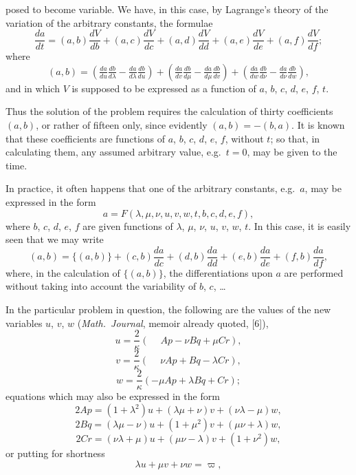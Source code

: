 \documentclass[11pt]{article}
\begin{document}
posed to become variable. We have, in this case, by Lagrange's theory of the variation of the arbitrary constants, the formulae
\[
\frac{da}{dt} = (a, b)\frac{dV}{db} + (a, c)\frac{dV}{dc} + (a, d)\frac{dV}{dd} + (a, e)\frac{dV}{de} + (a, f)\frac{dV}{df};
\]
where
\[
(a, b) = \left(\tfrac{da}{du}\tfrac{db}{d\lambda} - \tfrac{da}{d\lambda}\tfrac{db}{du}\right) + \left(\tfrac{da}{dv}\tfrac{db}{d\mu} - \tfrac{da}{d\mu}\tfrac{db}{dv}\right) + \left(\tfrac{da}{dw}\tfrac{db}{d\nu} - \tfrac{da}{d\nu}\tfrac{db}{dw}\right),
\]
and in which $V$ is supposed to be expressed as a function of $a$, $b$, $c$, $d$, $e$, $f$, $t$.

Thus the solution of the problem requires the calculation of thirty coefficients $(a, b)$, or rather of fifteen only, since evidently $(a, b) = -(b, a)$. It is known that these coefficients are functions of $a$, $b$, $c$, $d$, $e$, $f$, without $t$; so that, in calculating them, any assumed arbitrary value, e.g.\ $t = 0$, may be given to the time.

In practice, it often happens that one of the arbitrary constants, e.g.\ $a$, may be expressed in the form
\[
a = F(\lambda, \mu, \nu, u, v, w, t, b, c, d, e, f),
\]
where $b$, $c$, $d$, $e$, $f$ are given functions of $\lambda$, $\mu$, $\nu$, $u$, $v$, $w$, $t$. In this case, it is easily seen that we may write
\[
(a, b) = \{(a, b)\} + (c, b)\frac{da}{dc} + (d, b)\frac{da}{dd} + (e, b)\frac{da}{de} + (f, b)\frac{da}{df},
\]
where, in the calculation of $\{(a, b)\}$, the differentiations upon $a$ are performed without taking into account the variability of $b$, $c$, \ldots

In the particular problem in question, the following are the values of the new variables $u$, $v$, $w$ (\textit{Math.\ Journal}, memoir already quoted, [6]),
\[
u = \frac{2}{\kappa}(\phantom{-}Ap - \nu Bq + \mu Cr) \tag{29},
\]
\[
v = \frac{2}{\kappa}(\phantom{-}\nu Ap + Bq - \lambda Cr),
\]
\[
w = \frac{2}{\kappa}(-\mu Ap + \lambda Bq + Cr);
\]
equations which may also be expressed in the form
\[
2Ap = (1 + \lambda^2)u + (\lambda\mu + \nu)v + (\nu\lambda - \mu)w \tag{30},
\]
\[
2Bq = (\lambda\mu - \nu)u + (1 + \mu^2)v + (\mu\nu + \lambda)w,
\]
\[
2Cr = (\nu\lambda + \mu)u + (\mu\nu - \lambda)v + (1 + \nu^2)w,
\]
or putting for shortness
\[
\lambda u + \mu v + \nu w = \varpi \tag{31},
\]

\newpage
\setcounter{page}{244}
\end{document}

